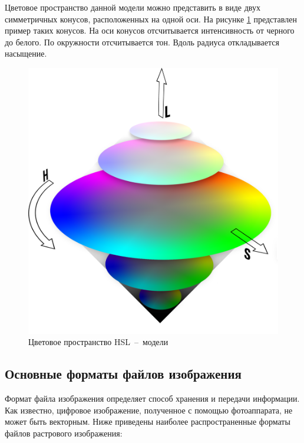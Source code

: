 \begin{enumerate}
	Цветовое пространство данной модели можно представить в виде двух симметричных конусов, расположенных на одной оси. На рисунке \ref{hsl_model} представлен пример таких конусов. На оси конусов отсчитывается интенсивность от черного до белого. По окружности отсчитывается тон. Вдоль радиуса откладывается насыщение.
	
	\begin{figure}[H]
		\centering
		\includegraphics[scale=0.25]{assets/hsl_cone.png}
		\caption{Цветовое пространство HSL~--~модели}
		\label{hsl_model}
	\end{figure}
	
\end{enumerate}

\subsection{Основные форматы файлов изображения}

Формат файла изображения определяет способ хранения и передачи информации. Как известно, цифровое изображение, полученное с помощью фотоаппарата, не может быть векторным. Ниже приведены наиболее распространенные форматы файлов растрового изображения:

